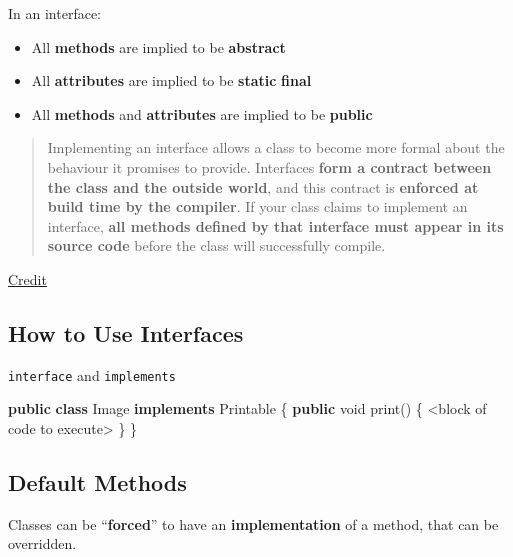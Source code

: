 \documentclass[]{article}
\newenvironment{Shaded}{}{}
\newcommand{\BuiltInTok}[1]{#1}
\newcommand{\DataTypeTok}[1]{\textcolor[rgb]{0.56,0.13,0.00}{#1}}
\newcommand{\FunctionTok}[1]{\textcolor[rgb]{0.02,0.16,0.49}{#1}}
\newcommand{\KeywordTok}[1]{\textcolor[rgb]{0.00,0.44,0.13}{\textbf{#1}}}
\newcommand{\NormalTok}[1]{#1}
\providecommand{\tightlist}{%
  \setlength{\itemsep}{0pt}\setlength{\parskip}{0pt}}
\begin{document}
In an interface:

\begin{itemize}
\tightlist
\item
  All \textbf{methods} are implied to be \textbf{abstract}
\item
  All \textbf{attributes} are implied to be \textbf{static}
  \textbf{final}
\item
  All \textbf{methods} and \textbf{attributes} are implied to be
  \textbf{public}
\end{itemize}

\begin{quote}
Implementing an interface allows a class to become more formal about the
behaviour it promises to provide. Interfaces \textbf{form a contract
between the class and the outside world}, and this contract is
\textbf{enforced at build time by the compiler}. If your class claims to
implement an interface, \textbf{all methods defined by that interface
must appear in its source code} before the class will successfully
compile.
\end{quote}

\href{https://docs.oracle.com/javase/tutorial/java/concepts/interface.html}{Credit}

\hypertarget{how-to-use-interfaces}{%
\subsection{How to Use Interfaces}\label{how-to-use-interfaces}}

\texttt{interface} and \texttt{implements}

\begin{Shaded}
\begin{Highlighting}[]
\KeywordTok{public} \KeywordTok{class} \BuiltInTok{Image} \KeywordTok{implements} \BuiltInTok{Printable}\NormalTok{ \{}
    \KeywordTok{public} \DataTypeTok{void} \FunctionTok{print}\NormalTok{() \{}
\NormalTok{    <block of code to execute>}
\NormalTok{    \}}
\NormalTok{\}}
\end{Highlighting}
\end{Shaded}

\hypertarget{default-methods}{%
\subsection{Default Methods}\label{default-methods}}

Classes can be ``\textbf{forced}'' to have an \textbf{implementation} of
a method, that can be overridden.
\end{document}
